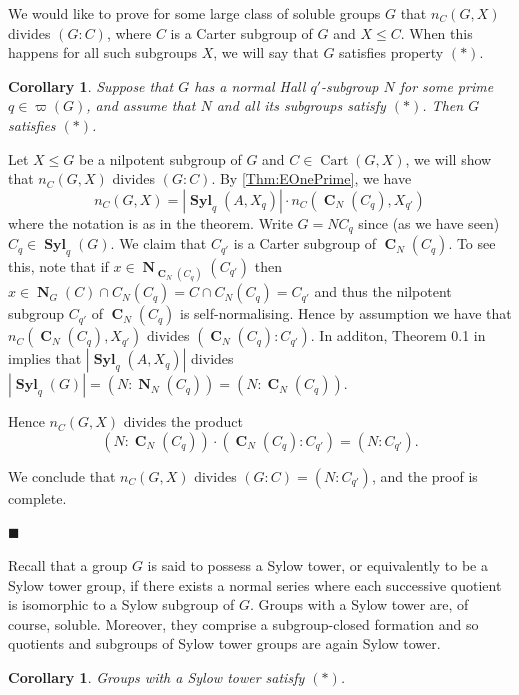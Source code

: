 \documentclass[10pt,a4paper]{amsart}
\numberwithin{equation}{section}
\DeclareMathOperator{\N}{\mathbf{N}}
\DeclareMathOperator{\cart}{Cart}
\DeclareMathOperator{\cent}{\mathbf{C}}
\DeclareMathOperator{\syl}{\mathbf{Syl}}
\renewcommand{\leq}{\leqslant}
\newenvironment{proofof}{{\bf {Proof.} }}{\hfill $\blacksquare$ \\}
\newtheorem{corollary}[theorem]{Corollary}
\begin{document}
 We would like to prove for some large class of soluble groups $G$ 
that $n_C(G,X)$ divides $(G:C)$, where $C$ is a Carter subgroup of $G$ and $X \leq C$. 
When this happens for all such subgroups $X$, 
we will say that $G$ satisfies property $(*)$.


\begin{corollary}\label{Cor:Asterisk}
Suppose that $G$ has a normal Hall $q'$-subgroup $N$ for some prime $q \in  \varpi(G)$, 
and assume that  $N$ and all its  subgroups satisfy $(*)$. 
Then $G$ satisfies $(*)$.
\end{corollary}

\begin{proofof}
Let  $X \leq G$ be a nilpotent subgroup of $G$ and $C \in \cart(G, X)$, we will show that $n_C(G,X)$ divides $(G:C)$.
By \autoref{Thm:EOnePrime}, we have 
\[
n_C(G,X) =|\syl_q(A, X_q) | \cdot n_C(\cent_N(C_{q}), X_{q'})
\]
where the notation is as in the theorem. Write $G=NC_q$   since (as we have seen)  $C_q \in \syl_q(G)$.
We claim that $C_{q'}$  is a Carter subgroup of $\cent_N(C_{q})$. 
To see this, note that if $x \in \N_{\cent_N(C_{q})} (C_{q'})$ then $x \in \N_G(C)  \cap C_N(C_q) = C  \cap C_N(C_q) = C_{q'}$ and thus the nilpotent subgroup  $C_{q'}$
of $\cent_N(C_{q})$ is self-normalising. Hence by assumption we have that 
$n_C(\cent_N(C_{q}), X_{q'})$
divides $(\cent_N(C_{q}) : C_{q'})$. In additon, Theorem 0.1 in \cite{arithmetical_questions} implies that $|\syl_q(A, X_q) |$ divides $|\syl_q(G) |= (N: \N_N(C_{q}))= (N: \cent_N(C_{q}))$.  

Hence $n_C(G,X)$ divides the product 
\[
(N: \cent_N(C_{q})) \cdot (\cent_N(C_{q}) : C_{q'}) = (N:C_{q'}).
\]

We conclude that $n_C(G,X)$ divides $(G:C)= (N:C_{q'})$, and  the proof is complete.

\end{proofof}

Recall that a group $G$ is said to possess a Sylow tower, 
or equivalently to be a Sylow tower group,
if there exists a normal series where each successive quotient is isomorphic to a Sylow subgroup of $G$.
Groups with a Sylow tower are, of course, soluble.
Moreover, they comprise a subgroup-closed formation 
and so quotients and subgroups of Sylow tower groups are again Sylow tower.

\begin{corollary}\label{Cor:SylowTower}
Groups with a Sylow tower satisfy $(*)$.
\end{corollary}
\end{document}
